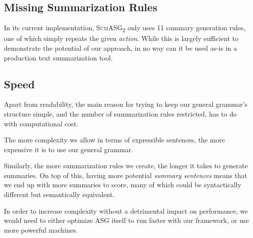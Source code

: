 \subsection{Missing Summarization Rules}

In its current implementation, \textsc{SumASG\textsubscript{2}} only uses 11 summary generation rules, one of which simply repeats the given \textit{action}. While this is largely sufficient to demonstrate the potential of our approach, in no way can it be used as-is in a production text summarization tool.

\subsection{Speed}

Apart from readability, the main reason for trying to keep our general grammar's structure simple, and the number of summarization rules restricted, has to do with computational cost.

The more complexity we allow in terms of expressible sentences, the more expensive it is to use our general grammar.

Similarly, the more summarization rules we create, the longer it takes to generate summaries. On top of this, having more potential \textit{summary sentences} means that we end up with more summaries to score, many of which could be syntactically different but semantically equivalent.

In order to increase complexity without a detrimental impact on performance, we would need to either optimize ASG itself to run faster with our framework, or use more powerful machines.